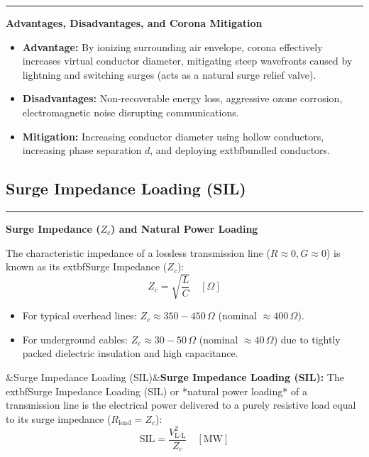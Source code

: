 \documentclass[11pt,a4paper]{article}
\newcommand{\concept}[1]{%
  \vspace{3pt}\noindent\textcolor{AnthGreen}{\rule{3.5pt}{10pt}}\enspace
  \textbf{\sffamily\color{AnthDark}#1}\par\vspace{2pt}%
}
\newenvironment{Def}[1][]{\begin{tcolorbox}[defbox]\ifx&#1&\else\textbf{\color{AnthOrange}#1:}\enspace\fi}{\end{tcolorbox}}
\begin{document}
\concept{Advantages, Disadvantages, and Corona Mitigation}
\begin{itemize}
  \item \textbf{Advantage:} By ionizing surrounding air envelope, corona effectively increases virtual conductor diameter, mitigating steep wavefronts caused by lightning and switching surges (acts as a natural surge relief valve).
  \item \textbf{Disadvantages:} Non-recoverable energy loss, aggressive ozone corrosion, electromagnetic noise disrupting communications.
  \item \textbf{Mitigation:} Increasing conductor diameter using hollow conductors, increasing phase separation $d$, and deploying 	extbf{bundled conductors}.
\end{itemize}

\subsection{Surge Impedance Loading (SIL)}

\concept{Surge Impedance ($Z_c$) and Natural Power Loading}
The characteristic impedance of a lossless transmission line ($R \approx 0, G \approx 0$) is known as its 	extbf{Surge Impedance ($Z_c$)}:
\begin{equation}
  Z_c = \sqrt{\frac{L}{C}} \quad [\Omega]
\end{equation}
\begin{itemize}
  \item For typical overhead lines: $Z_c \approx 350 - 450\,\Omega$ (nominal $\approx 400\,\Omega$).
  \item For underground cables: $Z_c \approx 30 - 50\,\Omega$ (nominal $\approx 40\,\Omega$) due to tightly packed dielectric insulation and high capacitance.
\end{itemize}

\begin{Def}[Surge Impedance Loading (SIL)]
The 	extbf{Surge Impedance Loading (SIL)} or *natural power loading* of a transmission line is the electrical power delivered to a purely resistive load equal to its surge impedance ($R_{\text{load}} = Z_c$):
\begin{equation}
  \text{SIL} = \frac{V_{\text{L-L}}^2}{Z_c} \quad [\text{MW}]
\end{equation}
\end{Def}
\end{document}
